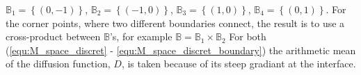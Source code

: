 $\mathbb{B}_1 = \left\{ (0,-1) \right\}$, $\mathbb{B}_2 = \left\{ (-1,0) \right\}$, $\mathbb{B}_3 = \left\{ (1,0) \right\}$, $\mathbb{B}_4 = \left\{ (0,1) \right\}$.
For the corner points, where two different boundaries connect, the result is to use a cross-product between $\mathbb{B}$'s, for example $\mathbb{B} = \mathbb{B}_1 \times \mathbb{B}_2$
For both (\ref{equ:M_space_discret} - \ref{equ:M_space_discret_boundary}) the arithmetic mean of the diffusion function, $D$, is taken because of its steep gradiant at the interface.


